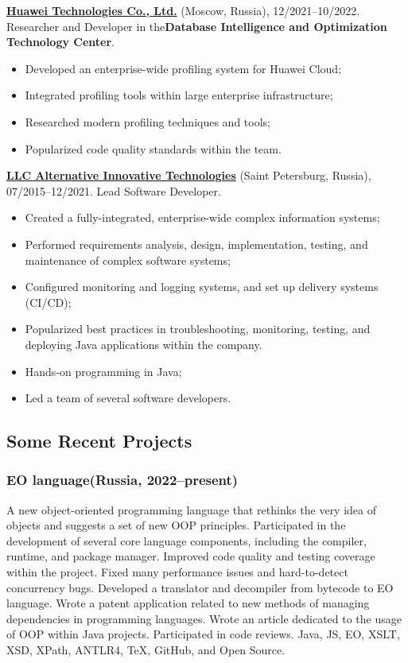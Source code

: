 \documentclass{vl}
\begin{document}
    \textbf{\href{https://www.huawei.com}{Huawei Technologies Co., Ltd.}} (Moscow, Russia), 12/2021--10/2022.\newline
    Researcher and Developer in the\textbf{Database Intelligence and Optimization Technology Center}.

    \begin{itemize}
        \item Developed an enterprise-wide profiling system for Huawei Cloud;
        \item Integrated profiling tools within large enterprise infrastructure;
        \item Researched modern profiling techniques and tools;
        \item Popularized code quality standards within the team.
    \end{itemize}

    \textbf{\href{https://altinntech.com/en/}{LLC Alternative Innovative Technologies}} (Saint Petersburg, Russia),
    07/2015--12/2021.
    Lead Software Developer.

    \begin{itemize}
        \item Created a fully-integrated, enterprise-wide complex information systems;
        \item Performed requirements analysis, design, implementation, testing, and maintenance of complex software
        systems;
        \item Configured monitoring and logging systems, and set up delivery systems (CI/CD);
        \item Popularized best practices in troubleshooting, monitoring, testing, and deploying Java applications
        within the company.
        \item Hands-on programming in Java;
        \item Led a team of several software developers.
    \end{itemize}

    \subsection*{Some Recent Projects}

    \subsubsection*{EO language(Russia, 2022--present)}
    A new object-oriented programming language
    that rethinks the very idea of objects and suggests a set of new OOP principles.
    Participated in the development of several core language components,
    including the compiler, runtime, and package manager.
    Improved code quality and testing coverage within the project.
    Fixed many performance issues and hard-to-detect concurrency bugs.
    Developed a translator and decompiler from bytecode to EO language.
    Wrote a patent application related to new methods of managing dependencies in programming languages.
    Wrote an article dedicated to the usage of OOP within Java projects.
    Participated in code reviews.
    Java, JS, EO, XSLT, XSD, XPath, ANTLR4, TeX, GitHub, and Open Source.
\end{document}
